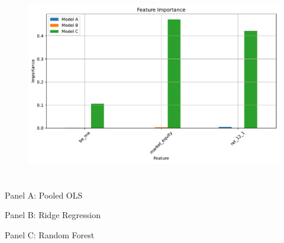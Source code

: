 \documentclass[hidelinks,12pt]{article}
\begin{document}
\FloatBarrier

\section{}
\begin{table}[htbp]
    \centering
    \caption{}
    \resizebox{!}{!}{}
\end{table}
\FloatBarrier
\section{}

\begin{figure}[htbp]
    \centering
    \includegraphics[width=.75\textwidth]{out/4.pdf}
\end{figure}
\FloatBarrier
\section{}
\subsection{}
\begin{table}[htbp]
    \centering
    \caption{}
    \resizebox{!}{!}{}
\end{table}
\FloatBarrier
\subsection{}
\begin{table}[htbp]
    \centering
    \caption{}
    \caption*{\scriptsize\textmd{Panel A: Pooled OLS}}
    \resizebox{0.65\textwidth}{!}{}
    
    \vspace{0.5cm} %
    
    \caption*{\scriptsize\textmd{Panel B: Ridge Regression}}
    \resizebox{0.65\textwidth}{!}{}
    
    \vspace{0.5cm} %
    
    \caption*{\scriptsize\textmd{Panel C: Random Forest}}
    \resizebox{0.65\textwidth}{!}{}
\end{table}
\FloatBarrier
\end{document}
